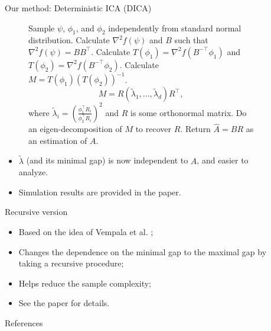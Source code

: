 \documentclass[final]{beamer} %
\begin{document}
\begin{frame}[c]
\begin{columns}[t,totalwidth=\textwidth]
	\begin{column}{0.01\textwidth}
	\end{column}
	\begin{column}{0.24\textwidth}
		\begin{block}{Our method: Deterministic ICA (DICA)}		
			\begin{figure}
			\begin{algorithmic}[1]
				\STATE Sample $\psi$, $\phi_1$, and $\phi_2$ independently from standard normal distribution.
				\STATE Calculate $\nabla^2 f(\psi)$ and $B$ such that $\nabla^2 f(\psi) = BB^{\top}$.
				\STATE Calculate $T(\phi_1) = \nabla^2 f(B^{-\top}\phi_1)$ and $T(\phi_2) = \nabla^2 f(B^{-\top}\phi_2)$.
				\STATE Calculate $M = T(\phi_1)(T(\phi_2))^{-1}$.
					\[
					M = R \left( \tilde{\lambda}_1, \ldots, \tilde{\lambda}_d \right)R^{\top},
					\]
					where $\tilde{\lambda}_i = \left(\frac{\phi_1^{\top}R_i}{\phi_2^{\top}R_i}\right)^2$ and $R$ is some orthonormal matrix.
				\STATE Do an eigen-decomposition of $M$ to recover $R$.
				\STATE Return $\hat{A} = BR$ as an estimation of $A$. 
			\end{algorithmic}
			\end{figure}
			\begin{itemize}
				\item $\tilde{\lambda}$ (and its minimal gap) is now independent to $A$, and easier to analyze.
				\item Simulation results are provided in the paper.
			\end{itemize}
		\end{block}
		\vspace{0.5ex}
		\begin{block}{Recursive version}
			\begin{itemize}
				\item Based on the idea of Vempala et al. \citep{vempala2014max};
				\item Changes the dependence on the minimal gap to the maximal gap by taking a recursive procedure;
				\item Helps reduce the sample complexity;
				\item See the paper for details.
			\end{itemize}
		\end{block}
		\begin{block}{References}
			\scriptsize
			
			
		\end{block}			
	\end{column}
		
	\begin{column}{0.01\textwidth}
	\end{column}
\end{columns}
 
\end{frame}
\end{document}
